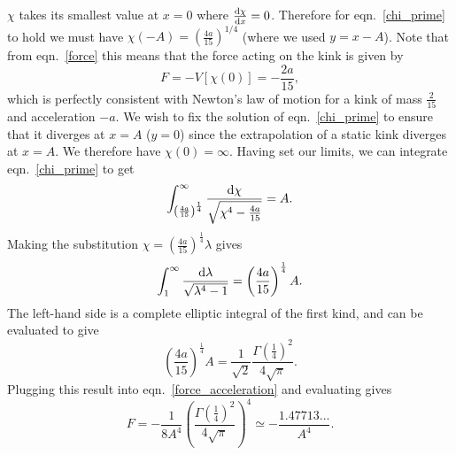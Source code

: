 \documentclass[11pt, oneside]{article}  	%
\numberwithin{equation}{section}
\newcommand{\drv}{\ensuremath{\textup{d}}}
\begin{document}
$\chi$ takes its smallest value at $x=0$ where $\frac{\drv\chi}{\drv x}=0$. Therefore for eqn.~\ref{chi_prime} to hold we must have $\chi(-A) = \left( \frac{4a}{15} \right)^{1/4}$ (where we used $y = x-A$). Note that from eqn.~\ref{force} this means that the force acting on the kink is given by
\begin{equation}\label{force_acceleration}
    F = -V\left[\chi(0)\right] = -\frac{2a}{15},
\end{equation}
which is perfectly consistent with Newton's law of motion for a kink of mass $\frac{2}{15}$ and acceleration $-a$. We wish to fix the solution of eqn.~\ref{chi_prime} to ensure that it diverges at $x = A$ ($y = 0$) since the extrapolation of a static kink diverges at $x=A$. We therefore have $\chi(0) = \infty$. Having set our limits, we can integrate eqn.~\ref{chi_prime} to get
\begin{equation}
    \int_{ \left( \frac{4a}{15} \right)^{\frac{1}{4}}}^{\infty}\frac{\drv \chi}{\sqrt{\chi^4 - \frac{4a}{15}}} = A.
\end{equation}
Making the substitution $\chi =\left( \frac{4a}{15}\right)^{\frac{1}{4}}\lambda$ gives
\begin{equation}
    \int_{1}^{\infty}\frac{\drv \lambda}{\sqrt{\lambda^4 - 1}} = \left( \frac{4a}{15}\right)^{\frac{1}{4}} A.
\end{equation}
The left-hand side is a complete elliptic integral of the first kind, and can be evaluated to give \cite{gradshtein_table_2007}
\begin{equation}
    \left( \frac{4a}{15}\right)^{\frac{1}{4}} A =\frac{1}{\sqrt{2}}\frac{\Gamma \left( \frac{1}{4}\right)^2}{4\sqrt{\pi}}.
\end{equation}
Plugging this result into eqn.~\ref{force_acceleration} and evaluating gives
\begin{equation} \label{prediction}
    F =-\frac{1}{8A^4}\left (\frac{\Gamma(\frac{1}{4})^2}{4\sqrt{\pi}}  \right )^4 \simeq -\frac{1.47713...}{A^4}.
\end{equation}
\end{document}
